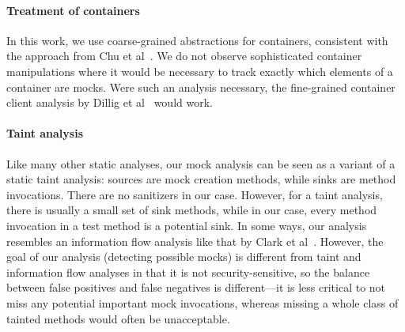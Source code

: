\paragraph{Treatment of containers} In this work, we use coarse-grained abstractions for containers, consistent with the approach from Chu et al~\cite{chu12:_collec_disjoin_analy}. We do not observe sophisticated container manipulations where it would be necessary to track exactly which elements of a container are mocks. Were such an analysis necessary, the fine-grained container client analysis by Dillig et al~\cite{dillig11:_precis_reason_progr_using_contain} would work.

\paragraph{Taint analysis} Like many other static analyses, our mock analysis can be seen as a variant of a static taint analysis: sources are mock creation methods, while sinks are method invocations. There are no sanitizers in our case. However, for a taint analysis, there is usually a small set of sink methods, while in our case, every method invocation in a test method is a potential sink. In some ways, our analysis resembles an information flow analysis like that by Clark et al~\cite{clark07:_static_analy_quant_infor_flow}. However, the goal of our analysis (detecting possible mocks) is different from taint and information flow analyses in that it is not security-sensitive, so the balance between false positives and false negatives is different---it is less critical to not miss any potential important mock invocations, whereas missing a whole class of tainted methods would often be unacceptable.



